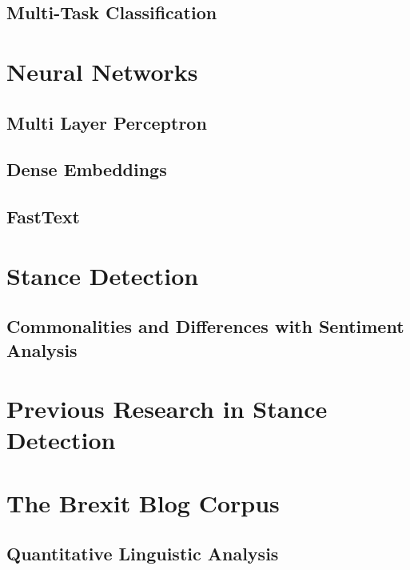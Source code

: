 \documentclass[Dissertation.tex]{subfiles}
\begin{document}
\subsection{Multi-Task Classification}
\section{Neural Networks}
\subsection{Multi Layer Perceptron}
\subsection{Dense Embeddings}
\subsection{FastText}
\section{Stance Detection}\label{stanceDetection}
	
\subsection{Commonalities and Differences with Sentiment Analysis}
\section{Previous Research in Stance Detection}
\section{The Brexit Blog Corpus}\label{BBC}
\subsection{Quantitative Linguistic Analysis}
\end{document}
